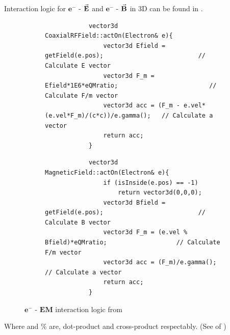 \documentclass[a4paper,oneside,12pt]{report}
\numberwithin{equation}{chapter}
\begin{document}
Interaction logic for $\textbf{e}^-$ - $\vec{\textbf{E}}$ and $\textbf{e}^-$ - $\vec{\textbf{B}}$ in 3D can be found in .
\begin{figure}[H]
    \captionsetup[subfigure]{justification=centering}
    \captionsetup{justification=centering}
    \begin{subfigure}{\textwidth}
        \begin{verbatim}
            vector3d CoaxialRFField::actOn(Electron& e){
                vector3d Efield = getField(e.pos);                          // Calculate E vector
                vector3d F_m = Efield*1E6*eQMratio;                         // Calculate F/m vector
                vector3d acc = (F_m - e.vel*(e.vel*F_m)/(c*c))/e.gamma();   // Calculate a vector
                return acc;
            }
        \end{verbatim}
    \end{subfigure}

    \begin{subfigure}{\textwidth}
        \begin{verbatim}
            vector3d MagneticField::actOn(Electron& e){
                if (isInside(e.pos) == -1)
                    return vector3d(0,0,0);
                vector3d Bfield = getField(e.pos);                          // Calculate B vector
                vector3d F_m = (e.vel % Bfield)*eQMratio;                   // Calculate F/m vector
                vector3d acc = (F_m)/e.gamma();                             // Calculate a vector
                return acc;
            }
        \end{verbatim}
    \end{subfigure}
    \caption{$\textbf{e}^-$ - $\textbf{EM}$ interaction logic from }
    \label{fig:3D_e_EM_interaction_first}
\end{figure}

Where \* and \% are, dot-product and cross-product respectably. (See  of )



\newpage


\appendix
\end{document}
